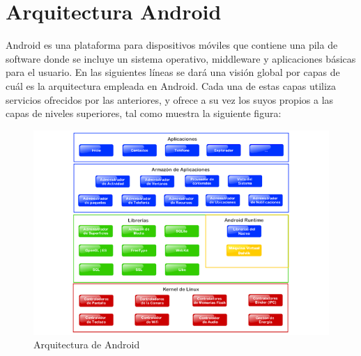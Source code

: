 \documentclass[letterpaper,12pt,openany,oneside]{book}
\begin{document}
\section{Arquitectura Android}

 Android es una plataforma para dispositivos móviles que contiene una pila de software donde se incluye un sistema operativo, middleware y aplicaciones básicas para el usuario. 
 En las siguientes líneas se dará una visión global por capas de cuál es la arquitectura empleada en Android. Cada una de estas capas utiliza servicios ofrecidos por las anteriores, y ofrece a su vez los suyos propios a las capas de niveles superiores, tal como muestra la siguiente figura: 


\begin{figure}[h]
\begin{center}
    \includegraphics[width=1.1\textwidth\ ,angle=0]{arquitectura_android.png}
  \caption{Arquitectura de Android }
  \label{fig:Arquitectura de Android }
\end{center}
\end{figure}
\end{document}
